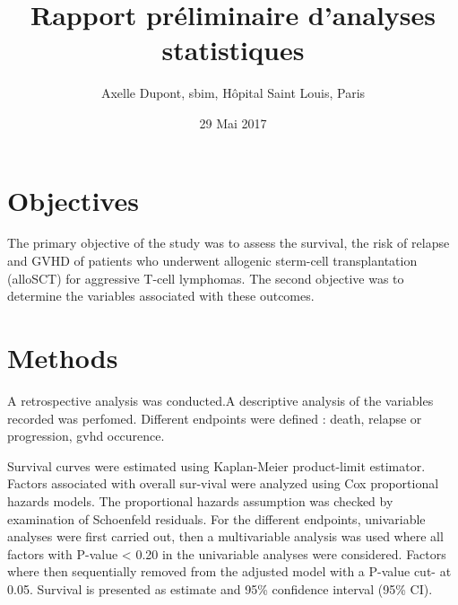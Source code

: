 \documentclass[a4paper,11pt] {article}
\begin{document}
\title{ Rapport préliminaire d'analyses statistiques}
\author{Axelle Dupont, sbim, Hôpital Saint Louis, Paris}
\date{29 Mai 2017}















\maketitle

\tableofcontents
\pagebreak[4]
\listoftables
\listoffigures


\pagebreak[4]

\section{Objectives}

The primary objective of the study was to assess the survival, the risk of relapse and GVHD  of patients who underwent allogenic sterm-cell transplantation (alloSCT) for aggressive T-cell lymphomas. 
The second objective was to determine the variables associated with these outcomes.

\section{Methods}

A  retrospective analysis was conducted.A descriptive analysis of the variables recorded was perfomed. Different endpoints were defined : death, relapse or progression, gvhd occurence.

Survival curves were estimated using Kaplan-Meier product-limit estimator. Factors associated with overall sur-vival were analyzed using Cox proportional hazards models. The proportional hazards assumption was checked by examination of Schoenfeld residuals.
For the different endpoints, univariable analyses were first carried out, then a multivariable analysis was used where all factors with P-value < 0.20 in the univariable analyses were considered. Factors where then sequentially removed from the adjusted model with a P-value cut- at 0.05. 
Survival is presented as estimate and 95\% confidence interval (95\% CI).
\end{document}
